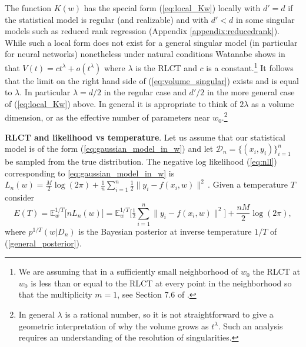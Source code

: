 \documentclass{article} %
\begin{document}
The function $K(w)$ has the special form (\ref{eq:local_Kw}) locally with $d' = d$ if the statistical model is regular (and realizable) and with $d' < d$ in some singular models such as reduced rank regression (Appendix \ref{appendix:reducedrank}). While such a local form does not exist for a general singular model (in particular for neural networks) nonetheless under natural conditions Watanabe shows in \citet[Theorem 7.1]{watanabe_algebraic_2009} that
$
V(t) = c t^\lambda + o( t^\lambda)
$
where $\lambda$ is the RLCT and $c$ is a constant.\footnote{We are assuming that in a sufficiently small neighborhood of $w_0$ the RLCT at $w_0$ is less than or equal to the RLCT at every point in the neighborhood so that the multiplicity $m = 1$, see Section 7.6 of \citep{watanabe_algebraic_2009}.} It follows that the limit on the right hand side of  (\ref{eq:volume_singular}) exists and is equal to $\lambda$. In particular $\lambda = d/2$ in the regular case and $d'/2$ in the more general case of (\ref{eq:local_Kw}) above. In general it is appropriate to think of $2 \lambda$ as a volume dimension, or as the effective number of parameters near $w_0$.\footnote{In general $\lambda$ is a rational number, so it is not straightforward to give a geometric interpretation of why the volume grows as $t^\lambda$. Such an analysis requires an understanding of the resolution of singularities.}


\textbf{RLCT and likelihood vs temperature}. Let us assume that our statistical model is of the form (\ref{eq:gaussian_model_in_w}) and let $\mathcal D_n = \{ (x_i,y_i) \}_{i=1}^n$ be sampled from the true distribution. The negative log likelihood (\ref{eq:nll}) corresponding to \eqref{eq:gaussian_model_in_w} is
$
L_n(w) = \frac{M}{2} \log(2\pi) + \frac{1}{n} \sum_{i=1}^n \frac{1}{2} \| y_i - f(x_i,w) \|^2\,.
$
Given a temperature $T$ consider
$$
E(T) = \mathbb{E}^{1/T}_w\big[nL_n(w) \big] = \mathbb{E}_w^{1/T}\Big[ \tfrac{1}{2} \sum_{i=1}^n \| y_i - f(x_i, w) \|^2 \Big] + \frac{nM}{2} \log(2\pi),
$$
where $p^{1/T}(w|D_n)$ is the Bayesian posterior at inverse temperature $1/T$ of (\ref{general_posterior}).
\end{document}
